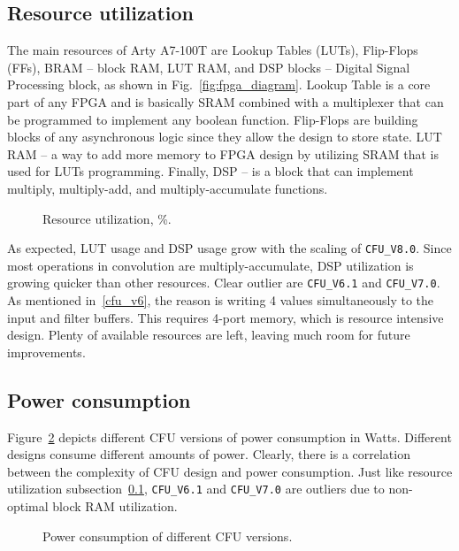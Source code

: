 \subsection{Resource utilization} \label{resource_utilization}
The main resources of Arty A7-100T are Lookup Tables (LUTs), Flip-Flops (FFs), BRAM -- block RAM, LUT RAM, and DSP blocks -- Digital Signal Processing block, as shown in Fig.~\ref{fig:fpga_diagram}. Lookup Table is a core part of any FPGA and is basically SRAM combined with a multiplexer that can be programmed to implement any boolean function. Flip-Flops are building blocks of any asynchronous logic since they allow the design to store state. LUT RAM -- a way to add more memory to FPGA design by utilizing SRAM that is used for LUTs programming. Finally, DSP -- is a block that can implement multiply, multiply-add, and multiply-accumulate functions. 

\begin{figure}[h!]
    \begin{center}
    \scalebox{0.8}{
        
    }
    \end{center}
    \caption{Resource utilization, \%.}
    \label{fig:resource_utilization}
\end{figure}

As expected, LUT usage and DSP usage grow with the scaling of \verb|CFU_V8.0|. Since most operations in convolution are multiply-accumulate, DSP utilization is growing quicker than other resources. Clear outlier are \verb|CFU_V6.1| and \verb|CFU_V7.0|. As mentioned in~\ref{cfu_v6}, the reason is writing 4 values simultaneously to the input and filter buffers. This requires 4-port memory, which is resource intensive design. Plenty of available resources are left, leaving much room for future improvements. 

\subsection{Power consumption}
Figure~\ref{fig:cfu_power_consumption} depicts different CFU versions of power consumption in Watts. Different designs consume different amounts of power. Clearly, there is a correlation between the complexity of CFU design and power consumption. Just like resource utilization subsection~\ref{resource_utilization}, \verb|CFU_V6.1| and \verb|CFU_V7.0| are outliers due to non-optimal block RAM utilization.

\begin{figure}[h!]
    \begin{center}
    \scalebox{0.8}{
        
    }
    \end{center}
    \caption{Power consumption of different CFU versions.}
    \label{fig:cfu_power_consumption}
\end{figure}

